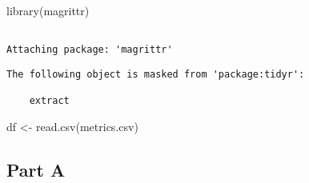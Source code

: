 \documentclass[
  letterpaper,
  DIV=11,
  numbers=noendperiod]{scrartcl}
\newenvironment{Shaded}{\begin{snugshade}}{\end{snugshade}}
\newcommand{\FunctionTok}[1]{\textcolor[rgb]{0.28,0.35,0.67}{#1}}
\newcommand{\NormalTok}[1]{\textcolor[rgb]{0.00,0.23,0.31}{#1}}
\newcommand{\OtherTok}[1]{\textcolor[rgb]{0.00,0.23,0.31}{#1}}
\newcommand{\StringTok}[1]{\textcolor[rgb]{0.13,0.47,0.30}{#1}}
\begin{document}
\begin{Shaded}
\begin{Highlighting}[]
\FunctionTok{library}\NormalTok{(magrittr)}
\end{Highlighting}
\end{Shaded}

\begin{verbatim}

Attaching package: 'magrittr'
\end{verbatim}

\begin{verbatim}
The following object is masked from 'package:tidyr':

    extract
\end{verbatim}

\begin{Shaded}
\begin{Highlighting}[]
\NormalTok{df }\OtherTok{\textless{}{-}} \FunctionTok{read.csv}\NormalTok{(}\StringTok{\textquotesingle{}metrics.csv\textquotesingle{}}\NormalTok{)}
\end{Highlighting}
\end{Shaded}

\subsection{Part A}\label{part-a}
\end{document}
